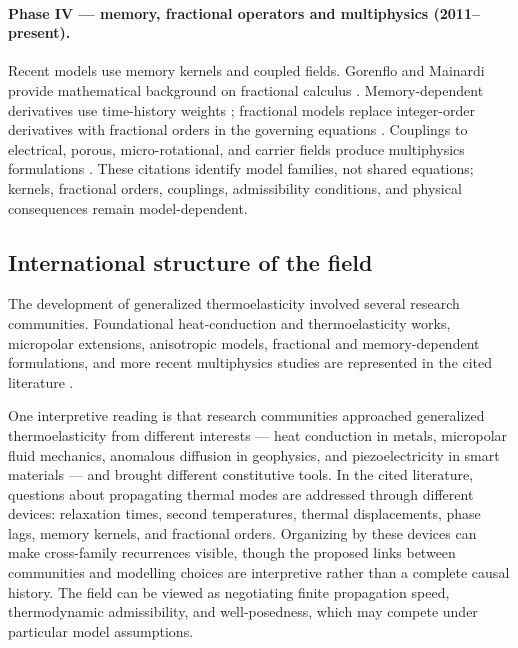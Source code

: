\paragraph{Phase IV --- memory, fractional operators and multiphysics (2011--present).} Recent models use memory kernels and coupled fields. Gorenflo and Mainardi provide mathematical background on fractional calculus \cite{Gorenflo1997}. Memory-dependent derivatives use time-history weights \cite{Wang2011}; fractional models replace integer-order derivatives with fractional orders in the governing equations \cite{Caputo1967,Povstenko2004,Povstenko2007,Povstenko2009,Povstenko2011,Povstenko2016}. Couplings to electrical, porous, micro-rotational, and carrier fields produce multiphysics formulations \cite{Iesan1986,Iesan2004,Cowin1983,Nunziato1979,Chandrasekharaiah1996,Marotti2013,Sharma2022,Abouelregal2023}. These citations identify model families, not shared equations; kernels, fractional orders, couplings, admissibility conditions, and physical consequences remain model-dependent.

\subsection{International structure of the field}

The development of generalized thermoelasticity involved several research communities. Foundational heat-conduction and thermoelasticity works, micropolar extensions, anisotropic models, fractional and memory-dependent formulations, and more recent multiphysics studies are represented in the cited literature \cite{Joseph1989,Biot1956,Lord1967,Green1972,Eringen1966a,TauchertClausAriman1968,Eringen1972,Dhaliwal1980,Sharma2022,Povstenko2004,Povstenko2007,Povstenko2009,Povstenko2011,Povstenko2016,Wang2011,Iesan1986,Iesan2004,Cowin1983,Nunziato1979,Chandrasekharaiah1996,Marotti2013,Abouelregal2023,Quintanilla2019,Barak2023,Barak2023IJP,Barak2023JTS,Barak2023MMMS,Gupta2023Energy,Gupta2023IJNMF,Kumar2023PhysScr,Gupta2026HeatMap}.

One interpretive reading is that research communities approached generalized thermoelasticity from different interests --- heat conduction in metals, micropolar fluid mechanics, anomalous diffusion in geophysics, and piezoelectricity in smart materials --- and brought different constitutive tools. In the cited literature, questions about propagating thermal modes are addressed through different devices: relaxation times, second temperatures, thermal displacements, phase lags, memory kernels, and fractional orders. Organizing by these devices can make cross-family recurrences visible, though the proposed links between communities and modelling choices are interpretive rather than a complete causal history. The field can be viewed as negotiating finite propagation speed, thermodynamic admissibility, and well-posedness, which may compete under particular model assumptions.

